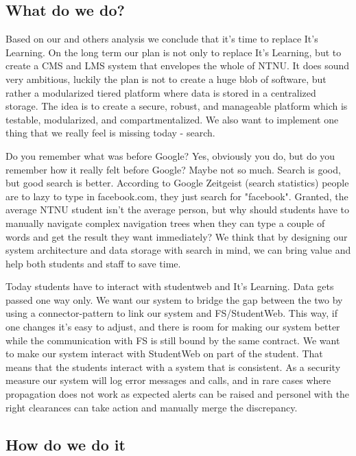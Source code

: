 \subsection{What do we do?}
Based on our and others analysis we conclude that it's time to replace It's Learning. On the long term our plan is not only to replace It's Learning, but to create
a CMS and LMS system that envelopes the whole of NTNU. It does sound very ambitious, luckily the plan is not to create a huge blob of software, but rather a modularized tiered 
platform where data is stored in a centralized storage. The idea is to create a secure, robust, and manageable platform which is testable, modularized, and compartmentalized.
We also want to implement one thing that we really feel is missing today - search. 

\noindent
Do you remember what was before Google? Yes, obviously you do, but do you remember how it really felt before Google? Maybe not so much. Search is good, but good search is better. 
According to Google Zeitgeist (search statistics) \cite{google:zeitgeist} people are to lazy to type in facebook.com, they just search for "facebook". Granted, the average NTNU 
student isn't the average person, but why should students have to manually navigate complex navigation trees when they can type a couple of words and get the result they want 
immediately? We think that by designing our system architecture and data storage with search in mind, we can bring value and help both students and staff to save time. 

\noindent
Today students have to interact with studentweb and It's Learning. Data gets passed one way only. We want our system to bridge the gap between the two by using a 
connector-pattern %
to link our system and FS/StudentWeb. This way, if one changes it's easy to adjust, and there is room for making our system better while the communication with FS is still bound by 
the same contract. We want to make our system interact with StudentWeb on part of the student. That means that the students interact with a system that is consistent. As a security 
measure our system will log error messages and calls, and in rare cases where propagation does not work as expected alerts can be raised and personel with the right clearances can 
take action and manually merge the discrepancy. %

\subsection{How do we do it}

